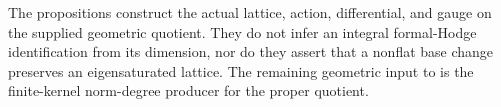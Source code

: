 The propositions construct the actual lattice, action,
differential, and gauge on the supplied geometric quotient.
They do not infer an integral formal-Hodge identification
from its dimension, nor do they assert that a nonflat
base change preserves an eigensaturated lattice.
The remaining geometric input to
 is the finite-kernel
norm-degree producer for the proper quotient.
